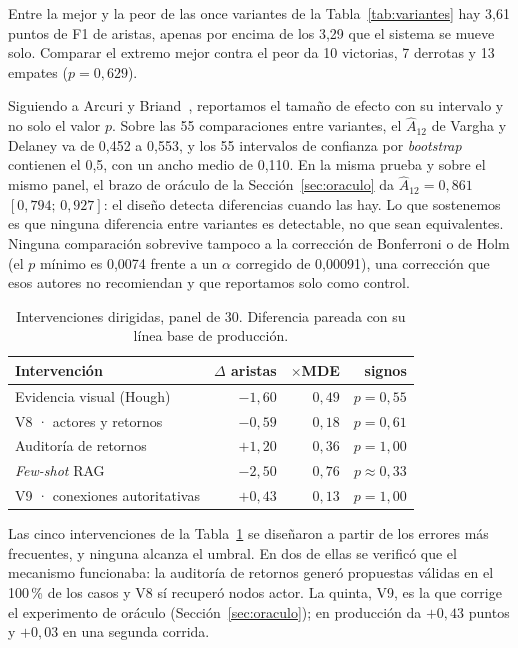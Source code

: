 \documentclass[a4paper, twocolumn, 10pt]{IEEEtran}
\begin{document}
Entre la mejor y la peor de las once variantes de la Tabla~\ref{tab:variantes} hay
3,61 puntos de F1 de aristas, apenas por encima de los 3,29 que el sistema se mueve
solo. Comparar el extremo mejor contra el peor da 10 victorias, 7 derrotas y 13
empates ($p=0{,}629$).

Siguiendo a Arcuri y Briand~\cite{Arcuri2011StatisticalSE}, reportamos el tamaño de
efecto con su intervalo y no solo el valor $p$. Sobre las 55 comparaciones entre
variantes, el $\hat{A}_{12}$ de Vargha y Delaney va de 0,452 a 0,553, y los 55
intervalos de confianza por \emph{bootstrap} contienen el 0,5, con un ancho medio de
0,110. En la misma prueba y sobre el mismo panel, el brazo de oráculo de la
Sección~\ref{sec:oraculo} da $\hat{A}_{12}=0{,}861$ $[0{,}794;\,0{,}927]$: el diseño
detecta diferencias cuando las hay. Lo que sostenemos es que ninguna diferencia
entre variantes es detectable, no que sean equivalentes. Ninguna comparación
sobrevive tampoco a la corrección de Bonferroni o de Holm (el $p$ mínimo es 0,0074
frente a un $\alpha$ corregido de 0,00091), una corrección que esos autores no
recomiendan y que reportamos solo como control.

\begin{table}[H]
\centering\small\setlength{\tabcolsep}{4pt}
\caption{Intervenciones dirigidas, panel de 30. Diferencia pareada con su línea
base de producción.}
\label{tab:intervenciones}
\begin{tabular}{lrrr}
\toprule
Intervención & $\Delta$ aristas & $\times$MDE & signos\\
\midrule
Evidencia visual (Hough)          & $-1{,}60$ & $0{,}49$ & $p=0{,}55$\\
V8 · actores y retornos           & $-0{,}59$ & $0{,}18$ & $p=0{,}61$\\
Auditoría de retornos             & $+1{,}20$ & $0{,}36$ & $p=1{,}00$\\
\emph{Few-shot} RAG               & $-2{,}50$ & $0{,}76$ & $p\approx0{,}33$\\
V9 · conexiones autoritativas     & $+0{,}43$ & $0{,}13$ & $p=1{,}00$\\
\bottomrule
\end{tabular}
\end{table}

Las cinco intervenciones de la Tabla~\ref{tab:intervenciones} se diseñaron a partir
de los errores más frecuentes, y ninguna alcanza el umbral. En dos de
ellas se verificó que el mecanismo funcionaba: la auditoría de retornos generó
propuestas válidas en el 100\,\% de los casos y V8 sí recuperó nodos actor. La
quinta, V9, es la que corrige el experimento de oráculo (Sección~\ref{sec:oraculo});
en producción da $+0{,}43$ puntos y $+0{,}03$ en una segunda corrida.
\end{document}
